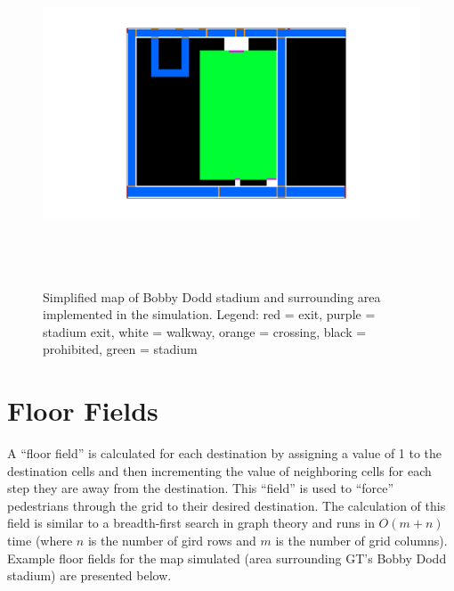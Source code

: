 \documentclass[paper=a4, fontsize=11pt]{scrartcl}
\numberwithin{equation}{section}		%
\numberwithin{figure}{section}			%
\numberwithin{table}{section}		    %
\begin{document}
\begin{appendices}
\begin{figure}[H]
	\begin{center} 
		\includegraphics[trim=250 60 220 60, clip, height=4in, width=5.5in]{stadium_simulation_map} 
		\caption{Simplified map of Bobby Dodd stadium and surrounding area implemented in the 
			simulation. Legend: red = exit, purple = stadium exit, white = walkway, orange = 
			crossing, 
			black = prohibited, green = stadium\label{fig:A:map}}
	\end{center} 
\end{figure}

\newpage
\section{Floor Fields}\label{sec:A:ff}
A ``floor field'' \cite{varas2007cellular} is calculated for each destination by assigning a 
value of 1 to the destination cells and then incrementing the value of neighboring cells for 
each step they are away from the destination. This ``field'' is used to ``force'' pedestrians 
through the grid to their desired destination. The calculation of this field is similar to a 
breadth-first search in graph theory and runs in $O(m+n)$ time (where $n$ is the number of gird 
rows and $m$ is the number of grid columns). Example floor fields for the map simulated (area 
surrounding GT's Bobby Dodd stadium) are presented below.\\


\end{appendices}
\end{document}
